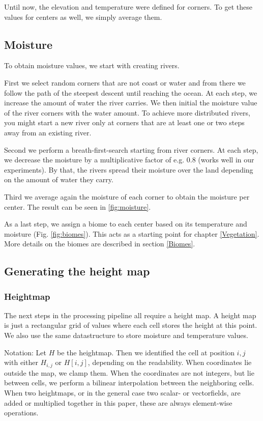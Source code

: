 \documentclass[journal, letterpaper]{IEEEtran}
\begin{document}
Until now, the elevation and temperature were defined for corners. To get these values for centers as well, we simply average them.

\subsection{Moisture}\label{PolygonalMoisture}
To obtain moisture values, we start with creating rivers.

First we select random corners that are not coast or water and from there we follow the path of the steepest descent until reaching the ocean. At each step, we increase the amount of water the river carries. We then initial the moisture value of the river corners with the water amount. To achieve more distributed rivers, you might start a new river only at corners that are at least one or two steps away from an existing river.

Second we perform a breath-first-search starting from river corners. At each step, we decrease the moisture by a multiplicative factor of e.g. 0.8 (works well in our experiments). By that, the rivers spread their moisture over the land depending on the amount of water they carry.

Third we average again the moisture of each corner to obtain the moisture per center.
The result can be seen in \ref{fig:moisture}.

As a last step, we assign a biome to each center based on its temperature and moisture (Fig. \ref{fig:biomes}). This acts as a starting point for chapter \ref{Vegetation}. More details on the biomes are described in section \ref{Biomes}.

\subsection{Generating the height map}
\subsubsection{Heightmap}
The next steps in the processing pipeline all require a height map. A height map is just a rectangular grid of values where each cell stores the height at this point. We also use the same datastructure to store moisture and temperature values.

Notation: Let $H$ be the heightmap. Then we identified the cell at position $i,j$ with either $H_{i,j}$ or $H[i,j]$, depending on the readability. When coordinates lie outside the map, we clamp them. When the coordinates are not integers, but lie between cells, we perform a bilinear interpolation between the neighboring cells. When two heightmaps, or in the general case two scalar- or vectorfields, are added or multiplied \mbox{together} in this paper, these are always element-wise operations.
\end{document}
